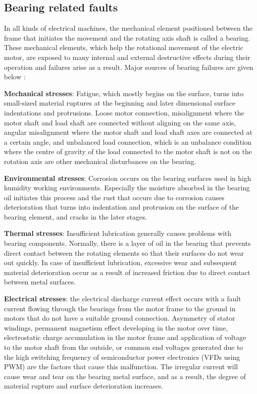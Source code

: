 \subsection{Bearing related faults}

In all kinds of electrical machines, the mechanical element positioned between the frame that initiates the movement and the rotating axis shaft is called a bearing. These mechanical elements, which help the rotational movement of the electric motor, are exposed to many internal and external destructive effects during their operation and failures arise as a result. Major sources of bearing failures are given below \cite{zhang2010survey,easa,skf,schoen1995motor,en201320958,bonnet2010}:

\textbf{Mechanical stresses}: Fatigue, which mostly begins on the surface, turns into small-sized material ruptures at the beginning and later dimensional surface indentations and protrusions. Loose motor connection, misalignment where the motor shaft and load shaft are connected without aligning on the same axis, angular misalignment where the motor shaft and load shaft axes are connected at a certain angle, and unbalanced load connection, which is an unbalance condition where the centre of gravity of the load connected to the motor shaft is not on the rotation axis are other mechanical disturbances on the bearing.

\textbf{Environmental stresses}: Corrosion occurs on the bearing surfaces used in high humidity working environments. Especially the moisture absorbed in the bearing oil initiates this process and the rust that occurs due to corrosion causes deterioration that turns into indentation and protrusion on the surface of the bearing element, and cracks in the later stages.

\textbf{Thermal stresses}: Insufficient lubrication generally causes problems with bearing components. Normally, there is a layer of oil in the bearing that prevents direct contact between the rotating elements so that their surfaces do not wear out quickly. In case of insufficient lubrication, excessive wear and subsequent material deterioration occur as a result of increased friction due to direct contact between metal surfaces.

\textbf{Electrical stresses}: the electrical discharge current effect occurs with a fault current flowing through the bearings from the motor frame to the ground in motors that do not have a suitable ground connection. Asymmetry of stator windings, permanent magnetism effect developing in the motor over time, electrostatic charge accumulation in the motor frame and application of voltage to the motor shaft from the outside, or common end voltages generated due to the high switching frequency of semiconductor power electronics (VFDs using PWM) are the factors that cause this malfunction. The irregular current will cause wear and tear on the bearing metal surface, and as a result, the degree of material rupture and surface deterioration increases.

